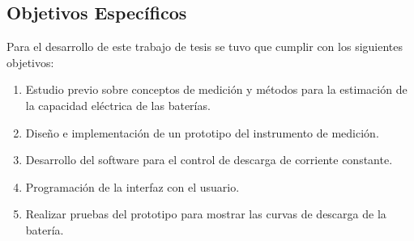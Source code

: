 \subsection{Objetivos Específicos}

Para el desarrollo de este trabajo de tesis se tuvo que cumplir con los siguientes objetivos:

\begin{enumerate}[label=(\alph*)]
\item Estudio previo sobre conceptos de medición y métodos para la estimación de la capacidad eléctrica de las baterías.
\item Diseño e implementación de un prototipo del instrumento de medición.
\item Desarrollo del software para el control de descarga de corriente constante.
\item Programación de la interfaz con el usuario.
\item Realizar pruebas del prototipo para mostrar las curvas de descarga de la batería.
\end{enumerate}

